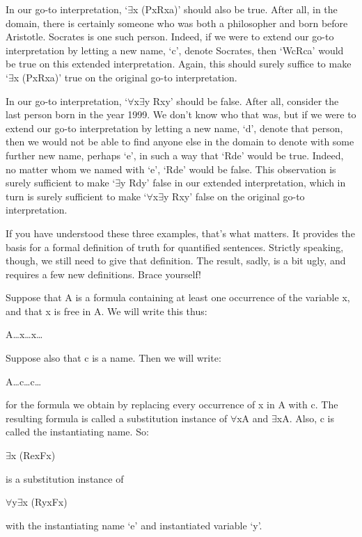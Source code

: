 In our go-to interpretation, ‘$\exists$x (Px\eand Rxa)’ should also be true. After all, in the domain, there is certainly someone who was both a philosopher and born before Aristotle. Socrates is one such person. Indeed, if we were to extend our go-to interpretation by letting a new name, ‘c’, denote Socrates, then ‘Wc\eand Rca’ would be true on this extended interpretation. Again, this should surely suffice to make ‘$\exists$x (Px\eand Rxa)’ true on the original go-to interpretation.

In our go-to interpretation, ‘$\forall$x$\exists$y Rxy’ should be false. After all, consider the last person born in the year 1999. We don’t know who that was, but if we were to extend our go-to interpretation by letting a new name, ‘d’, denote that person, then we would not be able to find anyone else in the domain to denote with some further new name, perhaps ‘e’, in such a way that ‘Rde’ would be true. Indeed, no matter whom we named with ‘e’, ‘Rde’ would be false. This observation is surely sufficient to make ‘$\exists$y Rdy’ false in our extended interpretation, which in turn is surely sufficient to make ‘$\forall$x$\exists$y Rxy’ false on the original go-to interpretation.

If you have understood these three examples, that’s what matters. It provides the basis for a formal definition of truth for quantified sentences. Strictly speaking, though, we still need to give that definition. The result, sadly, is a bit ugly, and requires a few new definitions. Brace yourself!

Suppose that A is a formula containing at least one occurrence of the variable x, and that x is free in A. We will write this thus:
\begin{center}
A\ldots x\ldots x\ldots 
\end{center}
Suppose also that c is a name. Then we will write:
\begin{center}
A\ldots c\ldots c\ldots 
\end{center}
for the formula we obtain by replacing every occurrence of x in A with c. The resulting formula is called a substitution instance of $\forall$xA and $\exists$xA. Also, c is called the instantiating name. So:
\begin{center}
$\exists$x (Rex\eiff Fx)
\end{center}
is a substitution instance of
\begin{center}
$\forall$y$\exists$x (Ryx\eiff Fx)
\end{center}
with the instantiating name ‘e’ and instantiated variable ‘y’.


